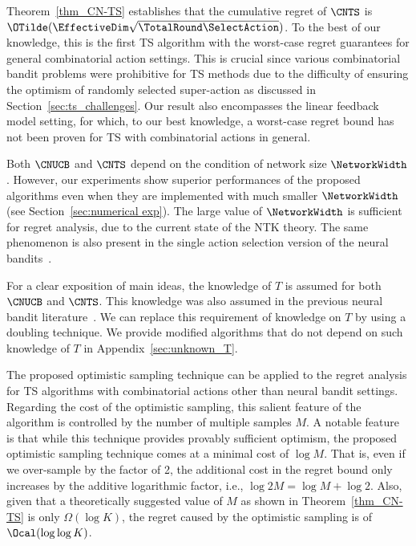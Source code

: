 \documentclass{article}
\theoremstyle{plain}
\begin{document}
%
 Theorem~\ref{thm_CN-TS} establishes that the cumulative regret of $\CNTS$ is $\OTilde(\EffectiveDim\sqrt{\TotalRound  \SelectAction})$.
To the best of our knowledge, this is the first TS algorithm with the worst-case regret guarantees for general combinatorial action settings. 
This is crucial since various combinatorial bandit problems were prohibitive for TS methods due to the difficulty of ensuring the optimism of randomly selected super-action as discussed in Section~\ref{sec:ts_challenges}. 
Our result also encompasses the linear feedback model setting, for which, to our best knowledge, a worst-case regret bound has not been proven for TS with combinatorial actions in general.
%
\begin{remark} \label{remark_limitation of NTK}
Both $\CNUCB$ and $\CNTS$ depend on the condition of network size $\NetworkWidth$. 
However, our experiments show superior performances of the proposed algorithms even when they are implemented with much smaller $\NetworkWidth$ (see Section~\ref{sec:numerical exp}). 
The large value of $\NetworkWidth$ is 
sufficient
for regret analysis, due to the current state of the NTK theory. 
The same phenomenon is also present in the single action selection version of the neural bandits~\cite{zhang2021neural,zhou2020neural}.
\end{remark}
%
\begin{remark}
For a clear exposition of main ideas, the knowledge of $T$ is assumed for both $\CNUCB$ and $\CNTS$. 
This knowledge was also assumed in the previous neural bandit literature~\cite{zhang2021neural,zhou2020neural}. We can replace this requirement of knowledge on $T$ by using a doubling technique. We provide modified algorithms that do not depend on such knowledge of $T$ in Appendix~\ref{sec:unknown_T}.
\end{remark}
%
\begin{remark}
The proposed optimistic sampling technique can be applied to the regret analysis for TS algorithms with combinatorial actions other than neural bandit settings.
Regarding the cost of the optimistic sampling, this salient feature of the algorithm is controlled by the number of multiple samples $M$.
A notable feature is that while this technique provides provably sufficient optimism, the proposed optimistic sampling technique comes at a minimal cost of $\log M$. 
That is, even if we over-sample by the factor of 2, the additional cost in the regret bound only increases by the additive logarithmic factor, i.e., $\log 2 M = \log M + \log 2$.
Also, given that a theoretically suggested value of $M$ as shown in Theorem~\ref{thm_CN-TS} is only $\Omega(\log K)$, the regret caused by the optimistic sampling is of $\Ocal(\log \log K)$.
\end{remark}
\end{document}
